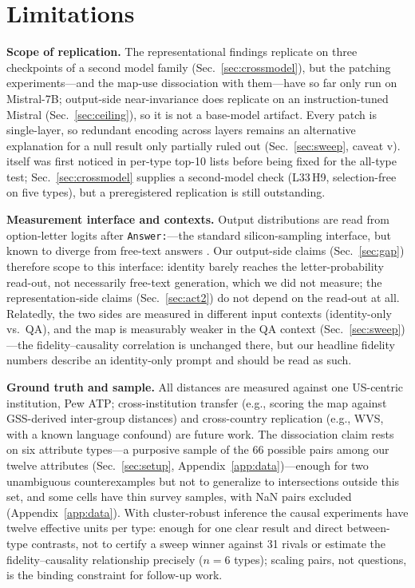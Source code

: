 \section{Limitations}
\label{sec:limitations}

\textbf{Scope of replication.} The representational findings replicate on
three checkpoints of a second model family (Sec.~\ref{sec:crossmodel}),
but the patching experiments---and the map-use dissociation with
them---have so far only run on Mistral-7B; output-side near-invariance
does replicate on an instruction-tuned Mistral (Sec.~\ref{sec:ceiling}),
so it is not a base-model artifact. Every patch is single-layer, so
redundant encoding across layers remains an alternative explanation for a
null result only partially ruled out (Sec.~\ref{sec:sweep}, caveat v).
\starhead{} itself was first noticed in per-type top-10 lists before
being fixed for the all-type test; Sec.~\ref{sec:crossmodel} supplies a
second-model check (L33\,H9, selection-free on five types), but a
preregistered replication is still outstanding.

\textbf{Measurement interface and contexts.} Output distributions are
read from option-letter logits after \texttt{Answer:}---the standard
silicon-sampling interface, but known to diverge from free-text answers
\citep{myanswerisc2024}. Our output-side claims (Sec.~\ref{sec:gap})
therefore scope to this interface: identity barely reaches the
letter-probability read-out, not necessarily free-text generation, which
we did not measure; the representation-side claims
(Sec.~\ref{sec:act2}) do not depend on the read-out at all. Relatedly,
the two sides are measured in different input contexts (identity-only
vs.\ QA), and the map is measurably weaker in the QA context
(Sec.~\ref{sec:sweep})---the fidelity--causality correlation is unchanged
there, but our headline fidelity numbers describe an identity-only prompt
and should be read as such.

\textbf{Ground truth and sample.} All distances are measured against one
US-centric institution, Pew ATP; cross-institution transfer (e.g.,
scoring the map against GSS-derived inter-group distances) and
cross-country replication (e.g., WVS, with a known language confound) are
future work. The dissociation claim rests on six attribute types---a
purposive sample of the 66 possible pairs among our twelve attributes
(Sec.~\ref{sec:setup}, Appendix~\ref{app:data})---enough for two
unambiguous counterexamples but not to generalize to intersections
outside this set, and some cells have thin survey samples, with NaN
pairs excluded (Appendix~\ref{app:data}). With cluster-robust inference
the causal experiments have twelve effective units per type: enough for
one clear result and direct between-type contrasts, not to certify a
sweep winner against 31 rivals or estimate the fidelity--causality
relationship precisely ($n{=}6$ types); scaling pairs, not questions, is
the binding constraint for follow-up work.

